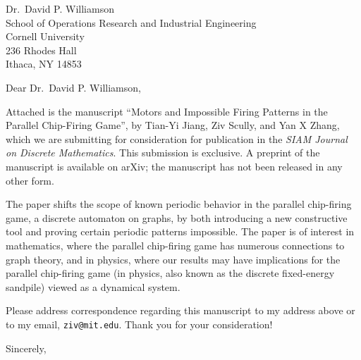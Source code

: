 \documentclass[11pt]{letter}
\begin{document}
\begin{letter}{
    Dr.~David P. Williamson \\
    School of Operations Research and Industrial Engineering \\
    Cornell University \\
    236 Rhodes Hall \\
    Ithaca, NY 14853
  }
  \opening{Dear Dr.~David P. Williamson,}

  Attached is the manuscript ``Motors and Impossible Firing Patterns in the
  Parallel Chip-Firing Game'', by Tian-Yi Jiang, Ziv Scully, and Yan X Zhang,
  which we are submitting for consideration for publication in the \textit{SIAM
    Journal on Discrete Mathematics}. This submission is exclusive. A preprint
  of the manuscript is available on arXiv; the manuscript has not been released
  in any other form.

  The paper shifts the scope of known periodic behavior in the parallel
  chip-firing game, a discrete automaton on graphs, by both introducing a new
  constructive tool and proving certain periodic patterns impossible. The paper
  is of interest in mathematics, where the parallel chip-firing game has
  numerous connections to graph theory, and in physics, where our results may
  have implications for the parallel chip-firing game (in physics, also known
  as the discrete fixed-energy sandpile) viewed as a dynamical system.

  Please address correspondence regarding this manuscript to my address above
  or to my email, \texttt{ziv@mit.edu}. Thank you for your consideration!

  \closing{Sincerely,}
\end{letter}
\end{document}
